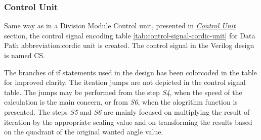 \documentclass[a4paper, twoside, 11pt]{article}
\begin{document}
        \subsubsection{Control Unit}\label{subsubsec:cordic-control-unit}
        Same way as in a Division Module Control unit, presented in \hyperref[subsubsec:division-control-unit]{\textit{Control Unit}} section, the control signal encoding table \ref{tab:control-signal-cordic-unit} for Data Path \gls{abbreviation:cordic} unit is created. The control signal in the Verilog design is named CS.\par
        The branches of if statements used in the design has been colorcoded in the table for improved clarity. The iteation jumps are not depicted in the control signal table. The jumps may be performed from the step \textit{S4}, when the speed of the calculation is the main concern, or from \textit{S6}, when the alogrithm function is presented. The steps \textit{S5} and \textit{S6} are mainly focused on multiplying the result of iteration by the appropriate scaling value and on transforming the results based on the quadrant of the original wanted angle value.
\end{document}
